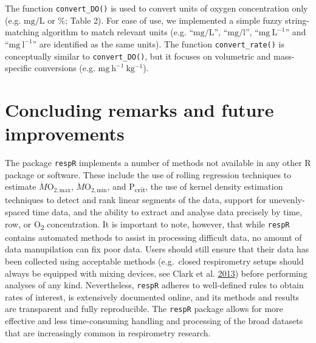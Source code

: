 \documentclass[a4paper,10pt, oneside]{memoir}
\begin{document}
The function \texttt{convert\_DO()} is used to convert units of oxygen concentration only (e.g. \(\mathrm{mg/L}\) or \%; Table 2).
For ease of use, we implemented a simple fuzzy string-matching algorithm to match relevant units (e.g. ``\(\mathrm{mg/L}\)'', ``\(\mathrm{mg/l}\)'', ``\(\mathrm{mg\ L^{-1}}\)'' and ``\(\mathrm{mg\ l^{-1}}\)'' are identified as the same units).
The function \texttt{convert\_rate()} is conceptually similar to \texttt{convert\_DO()}, but it focuses on volumetric and mass-specific conversions (e.g. \(\mathrm{mg\ h^{-1}\ kg^{-1}}\)).

\section{Concluding remarks and future improvements}

The package \texttt{respR} implements a number of methods not available in any other R package or software.
These include the use of rolling regression techniques to estimate \(\dot{M}\mathrm{O_{2,max}}\), \(\dot{M}\mathrm{O_{2,min}}\), and P\textsubscript{crit}, the use of kernel density estimation techniques to detect and rank linear segments of the data, support for unevenly-spaced time data, and the ability to extract and analyse data precisely by time, row, or O\textsubscript{2} concentration.
It is important to note, however, that while \texttt{respR} contains automated methods to assist in processing difficult data, no amount of data manupilation can fix poor data.
Users should still ensure that their data has been collected using acceptable methods (e.g.~closed respirometry setups should always be equipped with mixing devices, see Clark et al. \protect\hyperlink{ref-Clark2013}{2013}) before performing analyses of any kind.
Nevertheless, \texttt{respR} adheres to well-defined rules to obtain rates of interest, is extensively documented online, and its methods and results are transparent and fully reproducible.
The \texttt{respR} package allows for more effective and less time-consuming handling and processing of the broad datasets that are increasingly common in respirometry research.
\end{document}
